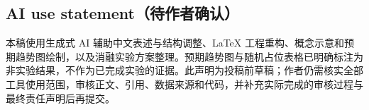 \subsection*{AI use statement（待作者确认）}

本稿使用生成式 AI 辅助中文表述与结构调整、LaTeX 工程重构、概念示意和预期趋势图绘制，以及消融实验方案整理。预期趋势图与随机占位表格已明确标注为非实验结果，不作为已完成实验的证据。此声明为投稿前草稿；作者仍需核实全部工具使用范围，审核正文、引用、数据来源和代码，并补充实际完成的审核过程与最终责任声明后再提交。
